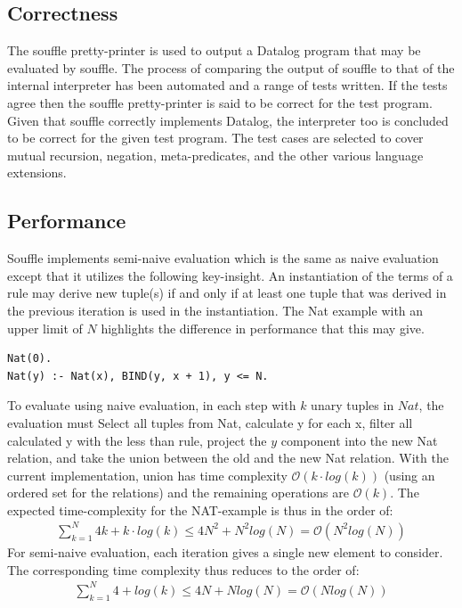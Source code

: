 \subsection{Correctness}
The souffle pretty-printer is used to output a Datalog program that may be evaluated by souffle. The process of comparing the output of souffle to that of the internal interpreter has been automated and a range of tests written. If the tests agree then the souffle pretty-printer is said to be correct for the test program. Given that souffle correctly implements Datalog, the interpreter too is concluded to be correct for the given test program. The test cases are selected to cover mutual recursion, negation, meta-predicates, and the other various language extensions.

\subsection{Performance}
Souffle implements semi-naive evaluation\cite{Green:2013:DRQ:2688167.2688168} which is the same as naive evaluation except that it utilizes the following key-insight. An instantiation of the terms of a rule may derive new tuple(s) if and only if at least one tuple that was derived in the previous iteration is used in the instantiation.
The Nat example with an upper limit of $N$ highlights the difference in performance that this may give.
\begin{verbatim}
Nat(0).
Nat(y) :- Nat(x), BIND(y, x + 1), y <= N.
\end{verbatim}
\noindent
To evaluate using naive evaluation, in each step with $k$ unary tuples in $Nat$, the evaluation must Select all tuples from Nat, calculate y for each x, filter all calculated y with the less than rule, project the $y$ component into the new Nat relation, and take the union between the old and the new Nat relation. With the current implementation, union has time complexity $\mathcal{O}(k \cdot log(k))$ (using an ordered set for the relations) and the remaining operations are $\mathcal{O}(k)$. The expected time-complexity for the NAT-example is thus in the order of:
\begin{align*}
\sum_{k = 1}^{N} 4 k + k \cdot log (k) \leq 4 N^2 + N^2 log(N) = \mathcal{O}(N^2 log(N))
\end{align*}
For semi-naive evaluation, each iteration gives a single new element to consider. The corresponding time complexity thus reduces to the order of:
\begin{align*}
	\sum_{k = 1}^{N} 4 + log (k) \leq 4N + N log(N) = \mathcal{O}(N log(N))
\end{align*}

